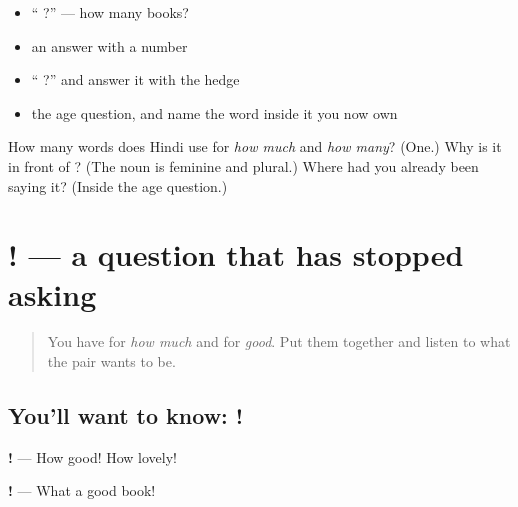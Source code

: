 \begin{itemize}
\raggedright
  \item \textquotedblleft{} ?\textquotedblright{} — how many books?
  \item an answer with a number
  \item \textquotedblleft{} ?\textquotedblright{} and answer it with the hedge
  \item the age question, and name the word inside it you now own
\end{itemize}

\begin{tcolorbox}[breakable,colback=teal!4,colframe=teal!35!black,title={Before you move on}]
How many words does Hindi use for \emph{how much} and \emph{how many}? (One.) Why is it \textbf{} in front of \textbf{}? (The noun is feminine and plural.) Where had you already been saying it? (Inside the age question.)
\end{tcolorbox}
\section[\texorpdfstring{\hi{कितना} \hi{अच्छा}! (kitnā acchā!)}{कितना अच्छा! (kitnā acchā!)}]{ ! — a question that has stopped asking}

\label{lesson:HI-C92-kitna-achchha}



\begin{quote}
You have \textbf{} for \emph{how much} and \textbf{} for \emph{good}. Put them together and listen to what the pair wants to be.
\end{quote}

\subsection*{You'll want to know:  !}
\textbf{ !} — How good! How lovely!

\textbf{  !} — What a good book!

